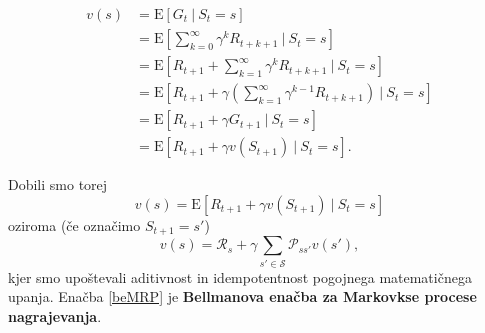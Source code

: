 \documentclass[12pt,a4paper]{amsart}
\theoremstyle{definition} %
\theoremstyle{plain} %
\begin{document}
\begin{align*}
    v(s) &= \mathrm{E} [G_t~|~S_t = s] \\
         &= \mathrm{E} [\sum_{k=0}^\infty \gamma^k R_{t + k + 1}~|~S_t = s] \\
         &= \mathrm{E} [R_{t+1} + \sum_{k=1}^\infty \gamma^k R_{t + k + 1}~|~S_t = s] \\
         &= \mathrm{E} [R_{t+1} + \gamma(\sum_{k=1}^\infty \gamma^{k-1} R_{t + k + 1})~|~S_t = s] \\
         &= \mathrm{E} [R_{t+1} + \gamma G_{t+1}~|~S_t = s] \\
         &= \mathrm{E} [R_{t+1} + \gamma v(S_{t+1})~|~S_t = s].
\end{align*}

Dobili smo torej 
$$
v(s) = \mathrm{E} [R_{t+1} + \gamma v(S_{t+1})~|~S_t = s]
$$
oziroma (če označimo $S_{t+1} = s'$)
\begin{equation}\label{beMRP}
    v(s) = \mathcal{R}_s + \gamma \sum_{s' \in \mathcal{S}} \mathcal{P}_{ss'} v(s'),
\end{equation} 
kjer smo upoštevali aditivnost in idempotentnost pogojnega matematičnega upanja. Enačba \eqref{beMRP}
je \textbf{Bellmanova enačba za Markovkse procese nagrajevanja}.
\end{document}
